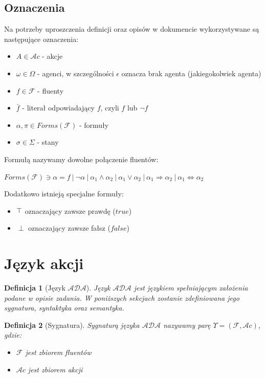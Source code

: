 \documentclass[11pt,a4paper]{article}
\newtheorem{definition}{Definicja}[section]
\def\tang{\ThisStyle{\abovebaseline[0pt]{\scalebox{-1}{$\SavedStyle\perp$}}}}
\begin{document}
    \subsection{Oznaczenia}
        Na potrzeby uproszczenia definicji oraz opisów w dokumencie wykorzystywane są następujące oznaczenia:
    \begin{itemize}
        \item $A \in \mathcal{A}c$ - akcje
        \item $\omega \in \Omega$ - agenci, w szczególności $\epsilon$ oznacza brak agenta (jakiegokolwiek agenta)
        \item $f \in \mathcal{F}$ - fluenty
        \item $\bar{f}$ - literał odpowiadający $f$, czyli $f$ lub $\neg f$
        \item $\alpha, \pi \in Forms(\mathcal{F})$ - formuły
        \item $\sigma \in \Sigma$ - stany
    \end{itemize}
   
    Formułą nazywamy dowolne połączenie fluentów:
    
    $Forms(\mathcal{F}) \ni \alpha = f~|~\neg \alpha~|~\alpha_1 \wedge \alpha_2~|~\alpha_1 \vee \alpha_2~|~\alpha_1 \Rightarrow \alpha_2~|~\alpha_1 \Leftrightarrow \alpha_2$
    
    Dodatkowo istnieją specjalne formuły:
    \begin{itemize}
        \item $\tang$ oznaczający zawsze prawdę ($true$)
        \item $\perp$ oznaczający zawsze fałsz ($false$)
    \end{itemize}

    \section{Język akcji}
    \begin{definition}[Język $\mathcal{ADA}$]
        Język $\mathcal{ADA}$ jest językiem spełniającym założenia podane w opisie zadania. W poniższych sekcjach zostanie zdefiniowana jego sygnatura, syntaktyka oraz semantyka.
    \end{definition}

    \begin{definition}[Sygnatura]
        Sygnaturą języka $\mathcal{ADA}$ nazywamy parę $\Upsilon=(\mathcal{F},\mathcal{A}c)$, gdzie:
        \begin{itemize}
            \item $\mathcal{F}$ jest zbiorem fluentów
            \item $\mathcal{A}c$ jest zbiorem akcji
        \end{itemize}
    \end{definition}
    
\end{document}
